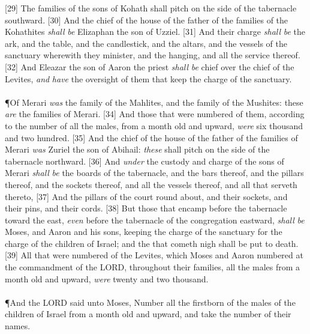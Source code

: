 [29] \textcolor[cmyk]{0.99998,1,0,0}{The families of the sons of Kohath shall pitch on the side of the tabernacle southward.}
[30] \textcolor[cmyk]{0.99998,1,0,0}{And the chief of the house of the father of the families of the Kohathites \emph{shall} \emph{be} Elizaphan the son of Uzziel.}
[31] \textcolor[cmyk]{0.99998,1,0,0}{And their charge \emph{shall} \emph{be} the ark, and the table, and the candlestick, and the altars, and the vessels of the sanctuary wherewith they minister, and the hanging, and all the service thereof.}
[32] \textcolor[cmyk]{0.99998,1,0,0}{And Eleazar the son of Aaron the priest \emph{shall} \emph{be} chief over the chief of the Levites, \emph{and} \emph{have} the oversight of them that keep the charge of the sanctuary.}\\
\\
\P \textcolor[cmyk]{0.99998,1,0,0}{Of Merari \emph{was} the family of the Mahlites, and the family of the Mushites: these \emph{are} the families of Merari.}
[34] \textcolor[cmyk]{0.99998,1,0,0}{And those that were numbered of them, according to the number of all the males, from a month old and upward, \emph{were} six thousand and two hundred.}
[35] \textcolor[cmyk]{0.99998,1,0,0}{And the chief of the house of the father of the families of Merari \emph{was} Zuriel the son of Abihail: \emph{these} shall pitch on the side of the tabernacle northward.}
[36] \textcolor[cmyk]{0.99998,1,0,0}{And \emph{under} the custody and charge of the sons of Merari \emph{shall} \emph{be} the boards of the tabernacle, and the bars thereof, and the pillars thereof, and the sockets thereof, and all the vessels thereof, and all that serveth thereto,}
[37] \textcolor[cmyk]{0.99998,1,0,0}{And the pillars of the court round about, and their sockets, and their pins, and their cords.}
[38] \textcolor[cmyk]{0.99998,1,0,0}{But those that encamp before the tabernacle toward the east, \emph{even} before the tabernacle of the congregation eastward, \emph{shall} \emph{be} Moses, and Aaron and his sons, keeping the charge of the sanctuary for the charge of the children of Israel; and the  that cometh nigh shall be put to death.}
[39] \textcolor[cmyk]{0.99998,1,0,0}{All that were numbered of the Levites, which Moses and Aaron numbered at the commandment of the LORD, throughout their families, all the males from a month old and upward, \emph{were} twenty and two thousand.}\\
\\
\P \textcolor[cmyk]{0.99998,1,0,0}{And the LORD said unto Moses, Number all the firstborn of the males of the children of Israel from a month old and upward, and take the number of their names.}
